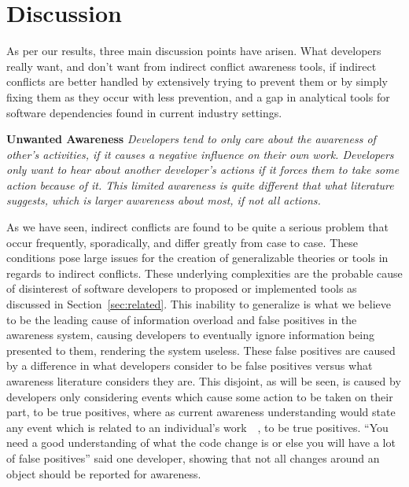 \documentclass[conference]{IEEEtran}
\begin{document}
\section{Discussion}
\label{sec:disc}

As per our results, three main discussion points have arisen. What developers really want, and don't want from indirect
conflict awareness tools, if indirect conflicts are better handled by extensively trying to prevent them or by simply
fixing them as they occur with less prevention, and a gap in analytical tools for software dependencies found in current
industry settings.

\textbf{Unwanted Awareness} \textit{Developers tend to only care about the awareness of other's activities, if it causes
a negative influence on their own work. Developers only want to hear about another developer's actions if it forces them
to take some action because of it. This limited awareness is quite different that what literature suggests, which is larger
awareness about most, if not all actions.}

As we have seen, indirect conflicts are found to be quite a serious problem that occur frequently,
sporadically, and differ greatly from case to case. These conditions pose large issues for the creation of generalizable theories
or tools in regards to indirect conflicts. These underlying complexities are the probable cause of disinterest of software developers
to proposed or implemented tools as discussed in Section~\ref{sec:related}. This inability to generalize is what we believe to be the
leading cause of information overload and false positives in the awareness system, causing developers to eventually ignore
information being presented to them, rendering the system useless. These false positives are caused by a difference in what
developers consider to be false positives versus what awareness literature considers they are. This disjoint, as will
be seen, is caused by developers only considering events which cause some action to be taken on their part, to be true positives,
where as current awareness understanding would state any event which is related to an individual's
work~\cite{Herbsleb06collaborationin}~\cite{Cataldo:2008:SCF}, to be true positives.
``You need a good understanding of what the code change is or else you will have a lot of false positives'' said one developer,
showing that not all changes around an object should be reported for awareness.
\end{document}
